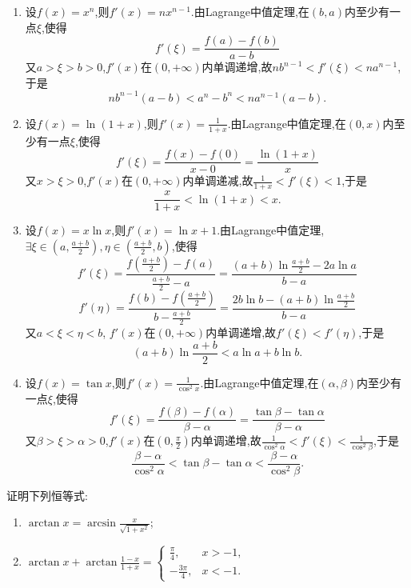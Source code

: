 \begin{solution}
    \begin{enumerate}
        \item 设$f(x) = x^n$,则$f'(x) = nx^{n-1}$.由Lagrange中值定理,在$(b,a)$内至少有一点$\xi$,使得
              $$
                  f'(\xi) = \frac{f(a)-f(b)}{a-b}
              $$
              又$a > \xi > b > 0$,$f'(x)$在$(0,+\infty)$内单调递增,故$nb^{n-1} < f'(\xi) < na^{n-1}$,于是$$nb^{n-1}(a-b) < a^n-b^n < na^{n-1}(a-b).$$
        \item 设$f(x) = \ln(1+x)$,则$f'(x) = \frac{1}{1+x}$.由Lagrange中值定理,在$(0,x)$内至少有一点$\xi$,使得
              $$
                  f'(\xi) = \frac{f(x)-f(0)}{x-0} = \frac{\ln(1+x)}{x}
              $$
              又$x > \xi > 0$,$f'(x)$在$(0,+\infty)$内单调递减,故$\frac{1}{1+x} < f'(\xi) < 1$,于是$$\frac{x}{1+x} < \ln(1+x) < x.$$
        \item 设$f(x) = x\ln x$,则$f'(x) = \ln x + 1$.由Lagrange中值定理,$\exists \xi \in \left(a, \frac{a+b}{2}\right), \eta \in \left( \frac{a+b}{2}, b \right)$,使得
              $$
                  f'(\xi) = \frac{f\left(\frac{a+b}{2}\right)-f(a)}{\frac{a+b}{2}-a} = \frac{(a+b)\ln\frac{a+b}{2} - 2a\ln a}{b-a}
              $$
              $$
                  f'(\eta) = \frac{f(b)-f\left(\frac{a+b}{2}\right)}{b-\frac{a+b}{2}} = \frac{2b\ln b - (a+b)\ln\frac{a+b}{2}}{b-a}
              $$
              又$a < \xi < \eta < b$, $f'(x)$在$(0,+\infty)$内单调递增,故$f'(\xi) < f'(\eta)$,于是$$(a+b)\ln\frac{a+b}{2} < a\ln a + b\ln b.$$
        \item 设$f(x) = \tan x$,则$f'(x) = \frac{1}{\cos^2 x}$.由Lagrange中值定理,在$(\alpha,\beta)$内至少有一点$\xi$,使得
              $$
                  f'(\xi) = \frac{f(\beta)-f(\alpha)}{\beta-\alpha} = \frac{\tan\beta - \tan\alpha}{\beta-\alpha}
              $$
              又$\beta > \xi > \alpha > 0$,$f'(x)$在$(0,\frac{\pi}{2})$内单调递增,故$\frac{1}{\cos^2\alpha} < f'(\xi) < \frac{1}{\cos^2\beta}$,于是$$\frac{\beta-\alpha}{\cos^2\alpha} < \tan\beta - \tan\alpha < \frac{\beta-\alpha}{\cos^2\beta}.$$
    \end{enumerate}
\end{solution}

\begin{exercise}[3.3.5]
    证明下列恒等式:
    \begin{enumerate}
        \item $\arctan x = \arcsin\frac{x}{\sqrt{1+x^2}}$;
        \item $\arctan x + \arctan\frac{1-x}{1+x} = \begin{cases} \frac{\pi}{4}, & x > -1, \\ -\frac{3\pi}{4}, & x < -1. \end{cases}$
    \end{enumerate}
\end{exercise}

